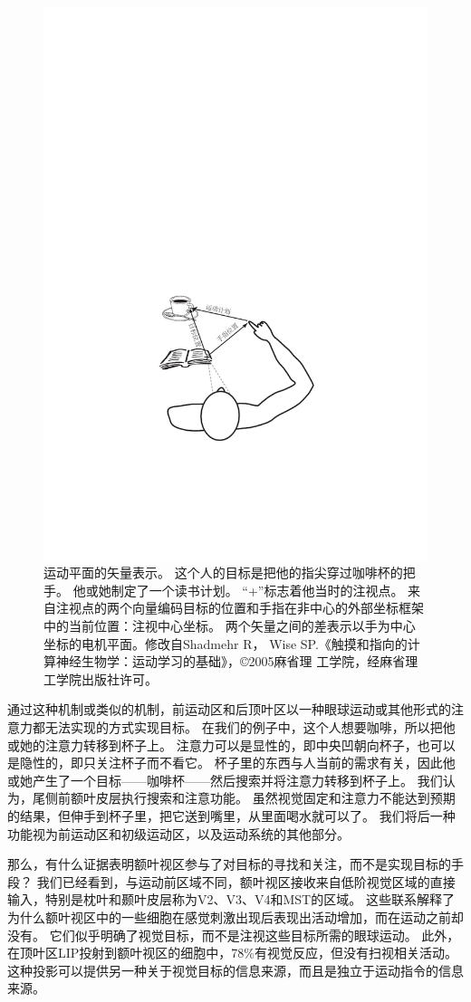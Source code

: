 \begin{figure}
	\centering
	\includegraphics[width=0.7\linewidth]{image_pfc/Fig_5_3}
	\caption{运动平面的矢量表示。
		这个人的目标是把他的指尖穿过咖啡杯的把手。
		他或她制定了一个读书计划。
		“+”标志着他当时的注视点。
		来自注视点的两个向量编码目标的位置和手指在非中心的外部坐标框架中的当前位置：注视中心坐标。
		两个矢量之间的差表示以手为中心坐标的电机平面。修改自Shadmehr R， Wise SP.《触摸和指向的计算神经生物学：运动学习的基础》，©2005麻省理 工学院，经麻省理工学院出版社许可。}
	\label{fig:5_3}
\end{figure}


通过这种机制或类似的机制，前运动区和后顶叶区以一种眼球运动或其他形式的注意力都无法实现的方式实现目标。
在我们的例子中，这个人想要咖啡，所以把他或她的注意力转移到杯子上。
注意力可以是显性的，即中央凹朝向杯子，也可以是隐性的，即只关注杯子而不看它。
杯子里的东西与人当前的需求有关，因此他或她产生了一个目标——咖啡杯——然后搜索并将注意力转移到杯子上。
我们认为，尾侧前额叶皮层执行搜索和注意功能。
虽然视觉固定和注意力不能达到预期的结果，但伸手到杯子里，把它送到嘴里，从里面喝水就可以了。
我们将后一种功能视为前运动区和初级运动区，以及运动系统的其他部分。


那么，有什么证据表明额叶视区参与了对目标的寻找和关注，而不是实现目标的手段？
我们已经看到，与运动前区域不同，额叶视区接收来自低阶视觉区域的直接输入，特别是枕叶和颞叶皮层称为V2、V3、V4和MST的区域\cite{stanton1995topography}。
这些联系解释了为什么额叶视区中的一些细胞在感觉刺激出现后表现出活动增加，而在运动之前却没有\cite{schall1991neuronal}。
它们似乎明确了视觉目标，而不是注视这些目标所需的眼球运动。
此外，在顶叶区LIP投射到额叶视区的细胞中，78\%有视觉反应，但没有扫视相关活动\cite{ferraina2002comparison}。
这种投影可以提供另一种关于视觉目标的信息来源，而且是独立于运动指令的信息来源。


